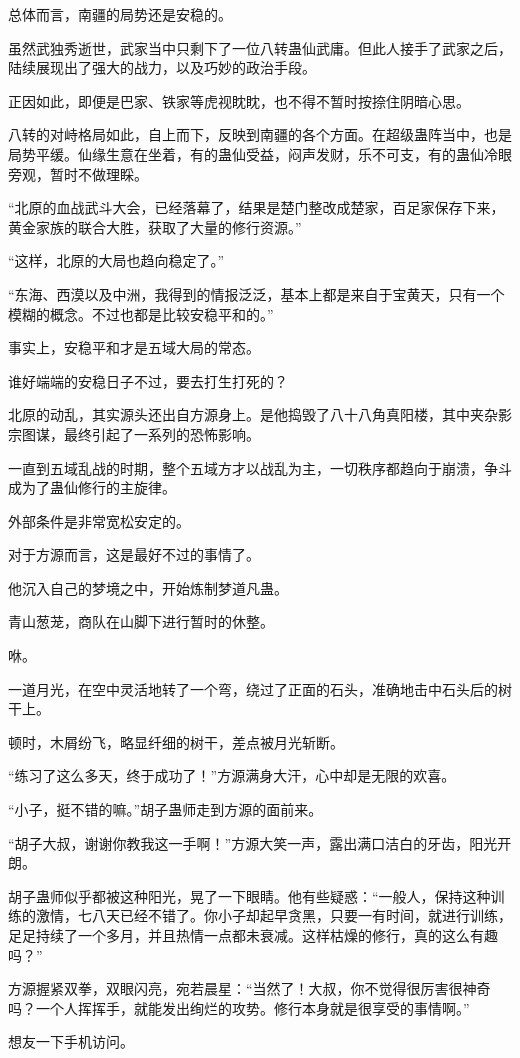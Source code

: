 \begin{this_body}
总体而言，南疆的局势还是安稳的。

虽然武独秀逝世，武家当中只剩下了一位八转蛊仙武庸。但此人接手了武家之后，陆续展现出了强大的战力，以及巧妙的政治手段。

正因如此，即便是巴家、铁家等虎视眈眈，也不得不暂时按捺住阴暗心思。

八转的对峙格局如此，自上而下，反映到南疆的各个方面。在超级蛊阵当中，也是局势平缓。仙缘生意在坐着，有的蛊仙受益，闷声发财，乐不可支，有的蛊仙冷眼旁观，暂时不做理睬。

“北原的血战武斗大会，已经落幕了，结果是楚门整改成楚家，百足家保存下来，黄金家族的联合大胜，获取了大量的修行资源。”

“这样，北原的大局也趋向稳定了。”

“东海、西漠以及中洲，我得到的情报泛泛，基本上都是来自于宝黄天，只有一个模糊的概念。不过也都是比较安稳平和的。”

事实上，安稳平和才是五域大局的常态。

谁好端端的安稳日子不过，要去打生打死的？

北原的动乱，其实源头还出自方源身上。是他捣毁了八十八角真阳楼，其中夹杂影宗图谋，最终引起了一系列的恐怖影响。

一直到五域乱战的时期，整个五域方才以战乱为主，一切秩序都趋向于崩溃，争斗成为了蛊仙修行的主旋律。

外部条件是非常宽松安定的。

对于方源而言，这是最好不过的事情了。

他沉入自己的梦境之中，开始炼制梦道凡蛊。

青山葱茏，商队在山脚下进行暂时的休整。

咻。

一道月光，在空中灵活地转了一个弯，绕过了正面的石头，准确地击中石头后的树干上。

顿时，木屑纷飞，略显纤细的树干，差点被月光斩断。

“练习了这么多天，终于成功了！”方源满身大汗，心中却是无限的欢喜。

“小子，挺不错的嘛。”胡子蛊师走到方源的面前来。

“胡子大叔，谢谢你教我这一手啊！”方源大笑一声，露出满口洁白的牙齿，阳光开朗。

胡子蛊师似乎都被这种阳光，晃了一下眼睛。他有些疑惑：“一般人，保持这种训练的激情，七八天已经不错了。你小子却起早贪黑，只要一有时间，就进行训练，足足持续了一个多月，并且热情一点都未衰减。这样枯燥的修行，真的这么有趣吗？”

方源握紧双拳，双眼闪亮，宛若晨星：“当然了！大叔，你不觉得很厉害很神奇吗？一个人挥挥手，就能发出绚烂的攻势。修行本身就是很享受的事情啊。”

想友一下手机访问。

\end{this_body}

